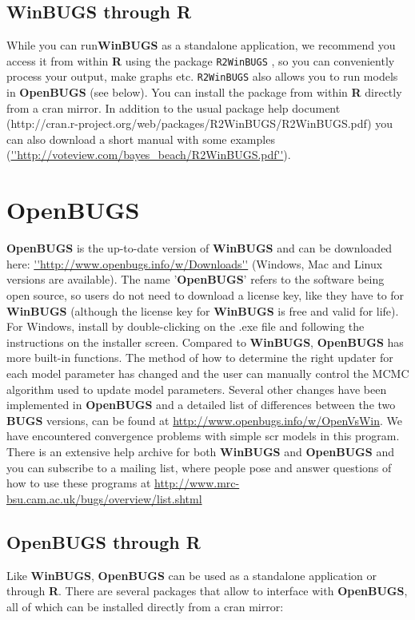 \subsection{WinBUGS through R}
While you can run{\bf WinBUGS} as a standalone application, we recommend you access it from within {\bf R} using the package {\tt R2WinBUGS} \citep{sturtz_etal:2005}, so you can conveniently process your output, make graphs etc.   {\tt R2WinBUGS} also allows you to run models in {\bf OpenBUGS} (see below). You can install the package from within {\bf R} directly from a cran mirror. In addition to the usual package help document (http://cran.r-project.org/web/packages/R2WinBUGS/R2WinBUGS.pdf) you can also download a short manual with some examples (\url{''http://voteview.com/bayes_beach/R2WinBUGS.pdf''}). 



\section{OpenBUGS}
{\bf OpenBUGS} is the up-to-date version of {\bf WinBUGS} and can be downloaded here: \url{''http://www.openbugs.info/w/Downloads''} (Windows, Mac and Linux versions are available).  The
name '{\bf OpenBUGS}' refers to the software being open source, so users 
do
not need to download a license key, like they have to for {\bf WinBUGS}
(although the license key for {\bf WinBUGS} is free and valid for life). For Windows, install by double-clicking on the .exe file and following the instructions on the installer screen. Compared to {\bf WinBUGS}, {\bf OpenBUGS} 
has  more built-in functions. The
method of how to determine the right updater for each model parameter
has changed and the user can manually control the MCMC algorithm used
to update model parameters.  Several other changes have been
implemented in {\bf OpenBUGS} and a detailed list of differences between the
two {\bf BUGS} versions, can be found at
\url{http://www.openbugs.info/w/OpenVsWin}. We have encountered convergence problems with simple scr models in this program. 
There is an extensive help archive for both {\bf WinBUGS} and {\bf OpenBUGS}
 and you can subscribe to a mailing list, where people pose and answer 
 questions of how to use these programs at 
 \url{http://www.mrc-bsu.cam.ac.uk/bugs/overview/list.shtml}

\subsection{OpenBUGS through R}
Like {\bf WinBUGS}, {\bf OpenBUGS} can be used as a standalone application or through {\bf R}. There are several packages that allow {\R} to interface with {\bf OpenBUGS}, all of which can be installed directly from a cran mirror:

